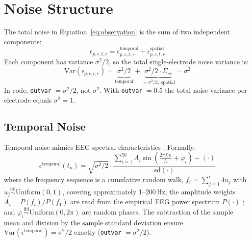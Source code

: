 \documentclass[12pt, a4paper]{article}
\begin{document}
\section{Noise Structure}\label{sec:noise}

The total noise in Equation~\eqref{eq:observation} is the sum of two
independent components:
%
\begin{equation}\label{eq:noise_decomp}
  \epsilon_{p,c,t,r} = \epsilon^{\text{temporal}}_{p,c,t,r}
                      + \epsilon^{\text{spatial}}_{p,c,t,r}
\end{equation}
%
Each component has variance $\sigma^2/2$, so the total single-electrode
noise variance is:
%
\begin{equation}\label{eq:noise_var}
  \mathrm{Var}(\epsilon_{p,c,t,r})
    = \underbrace{\sigma^2/2}_{\text{temporal}}
    + \underbrace{\sigma^2/2 \cdot \Sigma_{cc}}_{= \sigma^2/2,\ \text{spatial}}
    = \sigma^2
\end{equation}
%
In code, \texttt{outvar} $= \sigma^2/2$, not $\sigma^2$.
With \texttt{outvar} $= 0.5$ the total noise variance per electrode
equals $\sigma^2 = 1$.

\subsection{Temporal Noise}\label{sec:temporal_noise}

Temporal noise mimics EEG spectral characteristics \citep{Yeung2004}.
Formally:
%
\begin{equation}\label{eq:eeg_noise}
  \epsilon^{\text{temporal}}(t_n)
  = \sqrt{\sigma^2/2} \cdot
    \frac{\displaystyle\sum_{i=1}^{50}
          A_i \sin\!\left(\tfrac{2\pi f_i n}{f_s} + \varphi_i\right)
          - \bar{(\cdot)}}
         {\mathrm{sd}(\cdot)}
\end{equation}
%
where the frequency sequence is a cumulative random walk,
$f_i = \sum_{j=1}^{i} 4 u_j$ with $u_j \overset{\text{iid}}{\sim}
\mathrm{Uniform}(0,1)$, covering approximately 1--200\,Hz;
the amplitude weights $A_i = P(f_i)/P(f_1)$ are read from the empirical EEG
power spectrum $P(\cdot)$ \citep{Yeung2004,Rousselet2025};
and $\varphi_i \overset{\text{iid}}{\sim} \mathrm{Uniform}(0, 2\pi)$
are random phases.
The subtraction of the sample mean and division by the sample standard
deviation ensure $\mathrm{Var}(\epsilon^{\text{temporal}}) = \sigma^2/2$
exactly (\texttt{outvar} $= \sigma^2/2$).
\end{document}
